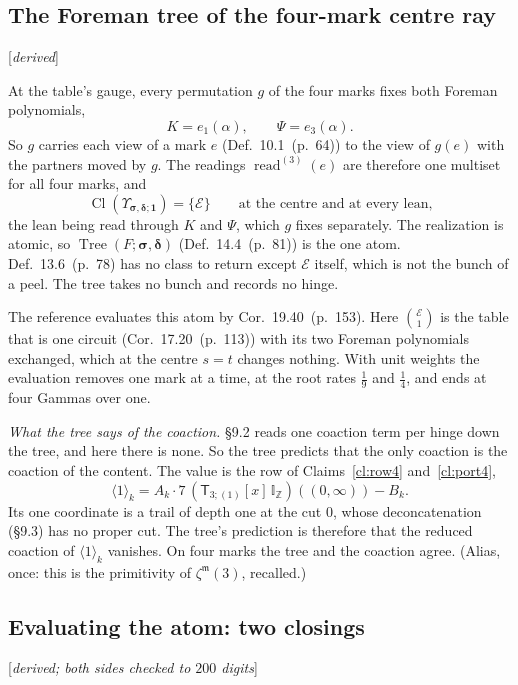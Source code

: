 \documentclass[11pt]{article}
\newcommand{\cE}{\mathcal E}
\newcommand{\one}{\mathbf 1}
\newcommand{\sT}{\mathsf T}
\newcommand{\IZ}{\mathbb I_{\mathbb Z}}
\newcommand{\Tx}[3]{(\sT_{#1;(1)}[x]\,#2)((#3,\infty))}
\newcommand{\status}[1]{\hfill{\small[\textit{#1}]}}
\newcommand{\hb}[2]{#1~(p.~#2)}   %
\theoremstyle{plain}
\theoremstyle{remark}
\begin{document}
\subsection{The Foreman tree of the four-mark centre ray}\status{derived}

At the table's gauge, every permutation $g$ of the four marks fixes both Foreman polynomials,
\[
K=e_1(\alpha),\qquad \Psi=e_3(\alpha).
\]
So $g$ carries each view of a mark $e$ (Def.~\hb{10.1}{64}) to the view of $g(e)$ with the partners moved by $g$. The readings $\operatorname{read}^{(3)}(e)$ are therefore one multiset for all four marks, and
\[
\operatorname{Cl}(\Upsilon_{\boldsymbol\sigma,\boldsymbol\delta;\one})=\{\cE\}\qquad\text{at the centre and at every lean,}
\]
the lean being read through $K$ and $\Psi$, which $g$ fixes separately. The realization is atomic, so $\operatorname{Tree}(F;\boldsymbol\sigma,\boldsymbol\delta)$ (Def.~\hb{14.4}{81}) is the one atom. Def.~\hb{13.6}{78} has no class to return except $\cE$ itself, which is not the bunch of a peel. The tree takes no bunch and records no hinge.

The reference evaluates this atom by Cor.~\hb{19.40}{153}. Here $\binom{\cE}1$ is the table that is one circuit (Cor.~\hb{17.20}{113}) with its two Foreman polynomials exchanged, which at the centre $s=t$ changes nothing. With unit weights the evaluation removes one mark at a time, at the root rates $\frac19$ and $\frac14$, and ends at four Gammas over one.

\emph{What the tree says of the coaction.} \S9.2 reads one coaction term per hinge down the tree, and here there is none. So the tree predicts that the only coaction is the coaction of the content. The value is the row of Claims~\ref{cl:row4} and~\ref{cl:port4},
\[
\langle1\rangle_k=A_k\cdot7\,\Tx3{\IZ}0-B_k .
\]
Its one coordinate is a trail of depth one at the cut $0$, whose deconcatenation (\S9.3) has no proper cut. The tree's prediction is therefore that the reduced coaction of $\langle1\rangle_k$ vanishes. On four marks the tree and the coaction agree. (Alias, once: this is the primitivity of $\zeta^{\mathfrak m}(3)$, recalled.)

\subsection{Evaluating the atom: two closings}\status{derived; both sides checked to $200$ digits}
\end{document}
